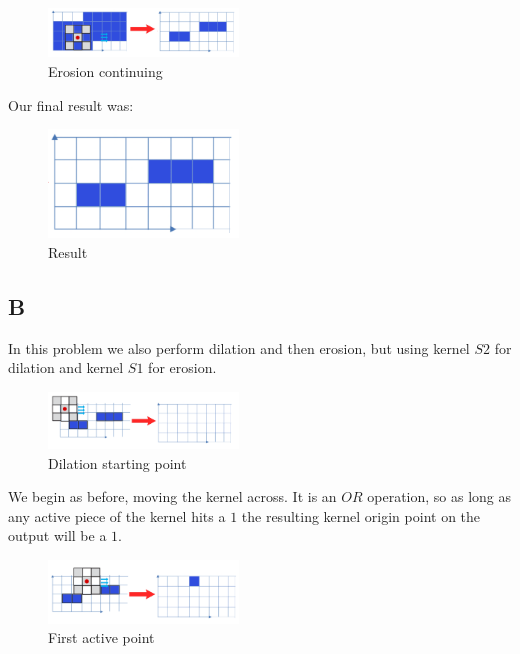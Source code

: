 \documentclass{article}
\begin{document}
\begin{figure}[H]
    \centering
    \includegraphics[width = 0.45\textwidth]{imgs/5/a12.png}
    \caption{Erosion continuing}
    \label{fig:a12}
\end{figure}

Our final result was:

\begin{figure}[H]
    \centering
    \includegraphics[width = 0.45\textwidth]{imgs/5/a13.png}
    \caption{Result}
    \label{fig:a13}
\end{figure}

\subsection*{B}

In this problem we also perform dilation and then erosion, but using kernel $S2$ for dilation and kernel $S1$ for erosion.

\begin{figure}[H]
    \centering
    \includegraphics[width = 0.45\textwidth]{imgs/5/b1.png}
    \caption{Dilation starting point}
    \label{fig:b1}
\end{figure}

We begin as before, moving the kernel across. It is an $OR$ operation, so as long as any active piece of the kernel hits a $1$ the resulting kernel origin point on the output will be a $1$.

\begin{figure}[H]
    \centering
    \includegraphics[width = 0.45\textwidth]{imgs/5/b2.png}
    \caption{First active point}
    \label{fig:b2}
\end{figure}
\end{document}
